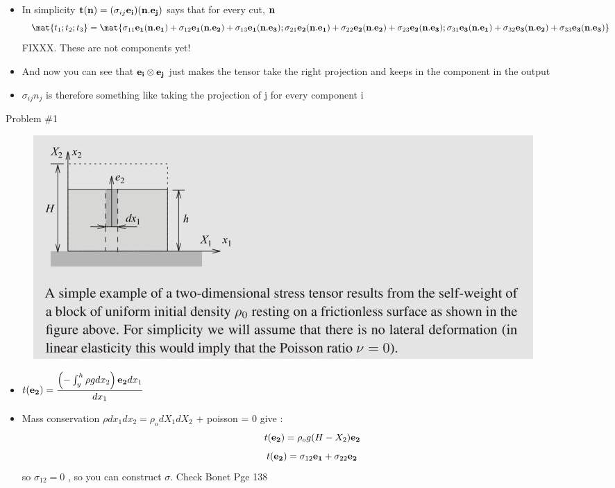 	\begin{frame}
		\begin{itemize}
			\item In simplicity $\mathbf{t(n)} = (\sigma_{ij}\mathbf{e_i})(\mathbf{n.e_j})$ says that for every cut, $\mathbf{n}$ 
			\begin{equation}
			\mat{t_1;t_2;t_3} = \mat{\sigma_{11}\ve{e_1(n.e_1)} + \sigma_{12}\ve{e_1(n.e_2)} + \sigma_{13}\ve{e_1(n.e_3)};\sigma_{21}\ve{e_2(n.e_1)} + \sigma_{22}\ve{e_2(n.e_2)} + \sigma_{23}\ve{e_2(n.e_3)} ; \sigma_{31}\ve{e_3(n.e_1)} + \sigma_{32}\ve{e_3(n.e_2)} + \sigma_{33}\ve{e_3(n.e_3)}}
			\end{equation}
			FIXXX. These are not components yet!
			\item And now you can see that $\mathbf{e_i \otimes e_j}$ just makes the tensor take the right projection and keeps in the component in the output
			\item $\sigma_{ij}n_j$ is therefore something like taking the projection of j for every component i
		\end{itemize}
	\end{frame}

	\begin{frame}{Problem \#1}
		\begin{figure}
			\centering
			\includegraphics[width=0.7\linewidth]{Figure/fig10}
		\end{figure}
	\begin{itemize}
		\item $t(\mathbf{e_2}) = \dfrac{\left(-\int_{y}^{h} \rho g dx_2 \right)\mathbf{e_2}dx_1}{dx_1}$
		\item Mass conservation $\rho dx_1dx_2 = \rho_o dX_1dX_2$ + poisson = 0 give :
		\begin{equation}
		t(\mathbf{e_2}) = \rho_o g (H- X_2) \mathbf{e_2}
		\end{equation}
		\begin{equation}
		t(\mathbf{e_2}) = \sigma_{12}\mathbf{e_1} + \sigma_{22}\mathbf{e_2}
		\end{equation}
		so $\sigma_{12} = 0$ , so you can construct $\sigma$. Check Bonet Pge 138
	\end{itemize}
	\end{frame}

